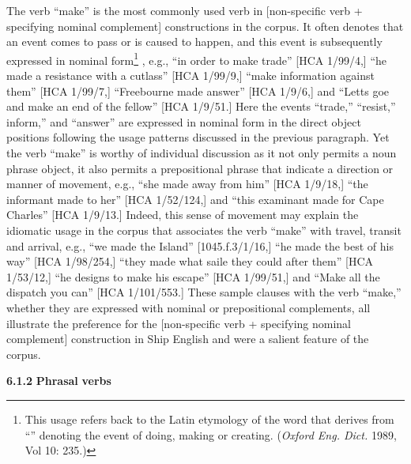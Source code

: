 The verb “make” is the most commonly used verb in [non-specific verb + specifying nominal complement] constructions in the corpus. It often denotes that an event comes to pass or is caused to happen, and this event is subsequently expressed in nominal form\footnote{This usage refers back to the Latin etymology of the word that derives from “” denoting the event of doing, making or creating. (\textit{Oxford Eng. Dict.} 1989, Vol 10: 235.)} , e.g., “in order to make trade” [HCA 1/99/4,] “he made a resistance with a cutlass” [HCA 1/99/9,] “make information against them” [HCA 1/99/7,] “Freebourne made answer” [HCA 1/9/6,] and “Letts goe and make an end of the fellow” [HCA 1/9/51.] Here the events “trade,” “resist,” inform,” and “answer” are expressed in nominal form in the direct object positions following the usage patterns discussed in the previous paragraph. Yet the verb “make” is worthy of individual discussion as it not only permits a noun phrase object, it also permits a prepositional phrase that indicate a direction or manner of movement, e.g., “she made away from him” [HCA 1/9/18,] “the informant made to her” [HCA 1/52/124,] and “this examinant made for Cape Charles” [HCA 1/9/13.] Indeed, this sense of movement may explain the idiomatic usage in the corpus that associates the verb “make” with travel, transit and arrival, e.g., “we made the Island” [1045.f.3/1/16,] “he made the best of his way” [HCA 1/98/254,] “they made what saile they could after them” [HCA 1/53/12,] “he designs to make his escape” [HCA 1/99/51,] and “Make all the dispatch you can” [HCA 1/101/553.] These sample clauses with the verb “make,” whether they are expressed with nominal or prepositional complements, all illustrate the preference for the [non-specific verb + specifying nominal complement] construction in Ship English and were a salient feature of the corpus. 

\textbf{6.1.2} \textbf{Phrasal} \textbf{verbs}

